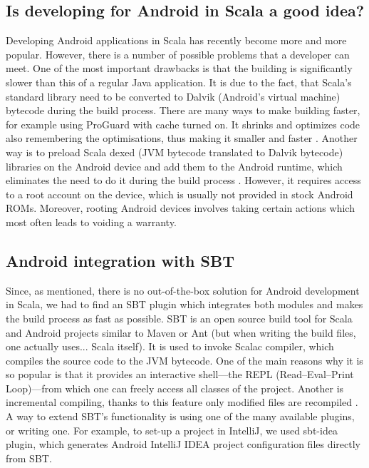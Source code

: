 \subsection{Is developing for Android in Scala a good idea?}
\label{subsec:good-idea}
Developing Android applications in Scala has recently become more and more popular. However, there is a number of possible problems that a developer can meet. One of the most important drawbacks is that the building is significantly slower than this of a regular Java application. It is due to the fact, that Scala's standard library need to be converted to Dalvik (Android's virtual machine) bytecode during the build process. There are many ways to make building faster, for example using ProGuard with cache turned on. It shrinks and optimizes code also remembering the optimisations, thus making it smaller and faster \cite{Berkel:2011:preinstall}. Another way is to preload Scala dexed (JVM bytecode translated to Dalvik bytecode) libraries on the Android device and add them to the Android runtime, which eliminates the need to do it during the build process \cite{Berkel:2011:preinstall}. However, it requires access to a root account on the device, which is usually not provided in stock Android ROMs. Moreover, rooting Android devices involves taking certain actions which most often leads to voiding a warranty.

\subsection{Android integration with SBT}
\label{subsec:android-sbt}
Since, as mentioned, there is no out-of-the-box solution for Android development in Scala, we had to find an SBT plugin which integrates both modules and makes the build process as fast as possible. SBT is an open source build tool for Scala and Android projects similar to Maven or Ant (but when writing the build files, one actually uses... Scala itself). It is used to invoke Scalac compiler, which compiles the source code to the JVM bytecode. One of the main reasons why it is so popular is that it provides an interactive shell---the REPL (Read--Eval--Print Loop)---from which one can freely access all classes of the project. Another is incremental compiling, thanks to this feature only modified files are recompiled \cite{Fatin:2012:NewWay}. A way to extend SBT's functionality is using one of the many available plugins, or writing one. For example, to set-up a project in IntelliJ, we used sbt-idea plugin, which generates Android IntelliJ IDEA project configuration files directly from SBT.

